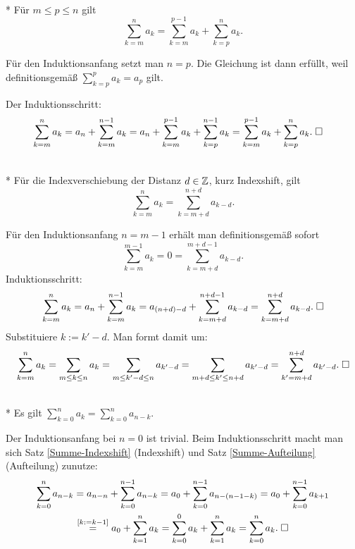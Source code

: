 \begin{Satz}%
\label{Summe-Aufteilung}\mbox{}\\*
Für $m\le p\le n$ gilt
\[\sum_{k=m}^n a_k = \sum_{k=m}^{p-1} a_k+\sum_{k=p}^n a_k.\]
\end{Satz}
 Für den Induktionsanfang setzt man $n=p$. Die Gleichung
ist dann erfüllt, weil definitionsgemäß $\sum_{k=p}^p a_k=a_p$
gilt.

Der Induktionsschritt:
\begin{align*}
\sum_{k=m}^n a_k &= a_n+\sum_{k=m}^{n-1} a_k
= a_n + \sum_{k=m}^{p-1} a_k + \sum_{k=p}^{n-1} a_k
= \sum_{k=m}^{p-1} a_k + \sum_{k=p}^n a_k.\;\Box
\end{align*}

\newpage
\begin{Satz}[Indexshift]%
\label{Summe-Indexshift}\mbox{}\\*
Für die Indexverschiebung der Distanz $d\in\mathbb Z$,
kurz Indexshift, gilt%
\[\sum_{k=m}^n a_k = \sum_{k=m+d}^{n+d} a_{k-d}.\]
\end{Satz}
Für den Induktionsanfang $n=m-1$ erhält man definitionsgemäß sofort%
\[\sum_{k=m}^{m-1} a_k = 0 = \sum_{k=m+d}^{m+d-1} a_{k-d}.\]
Induktionsschritt:
\begin{align*}
\sum_{k=m}^n a_k = a_n+\sum_{k=m}^{n-1} a_k
= a_{(n+d)-d}+\sum_{k=m+d}^{n+d-1} a_{k-d}
= \sum_{k=m+d}^{n+d} a_{k-d}.\;\Box
\end{align*}
 Substituiere $k:=k'-d$. Man formt damit um:%
\begin{align*}
\sum_{k=m}^n a_k = \sum_{m\le k\le n} a_k
= \sum_{m\le k'-d\le n} a_{k'-d}
= \sum_{m+d\le k'\le n+d} a_{k'-d}
= \sum_{k'=m+d}^{n+d} a_{k'-d}.\;\Box
\end{align*}

\begin{Satz}%
\label{Summe-Umkehrung}\mbox{}\\*
Es gilt $\sum_{k=0}^n a_k = \sum_{k=0}^n a_{n-k}$.
\end{Satz}
Der Induktionsanfang bei $n=0$ ist trivial. Beim Induktionsschritt
macht man sich Satz \ref{Summe-Indexshift} (Indexshift) und
Satz \ref{Summe-Aufteilung} (Aufteilung) zunutze:%
\begin{gather*}
\sum_{k=0}^n a_{n-k} = a_{n-n}+\sum_{k=0}^{n-1} a_{n-k}
= a_0+\sum_{k=0}^{n-1} a_{n-(n-1-k)}
= a_0+\sum_{k=0}^{n-1} a_{k+1}\\
\stackrel{[k:=k-1]}= a_0+\sum_{k=1}^n a_k
= \sum_{k=0}^0 a_k + \sum_{k=1}^n a_k
= \sum_{k=0}^n a_k.\;\Box
\end{gather*}

